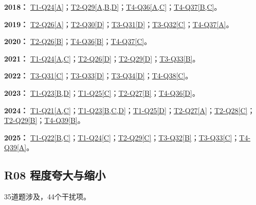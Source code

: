 \documentclass[11pt,a4paper]{article}
\begin{document}
\noindent\textbf{2018：} \hyperref[idx-2018-T1-Q24]{T1-Q24[A]}；\hyperref[idx-2018-T2-Q29]{T2-Q29[A,B,D]}；\hyperref[idx-2018-T4-Q36]{T4-Q36[A,C]}；\hyperref[idx-2018-T4-Q37]{T4-Q37[B,C]}。\par\smallskip
\noindent\textbf{2019：} \hyperref[idx-2019-T2-Q26]{T2-Q26[A]}；\hyperref[idx-2019-T2-Q30]{T2-Q30[D]}；\hyperref[idx-2019-T3-Q31]{T3-Q31[D]}；\hyperref[idx-2019-T3-Q32]{T3-Q32[C]}；\hyperref[idx-2019-T4-Q37]{T4-Q37[A]}。\par\smallskip
\noindent\textbf{2020：} \hyperref[idx-2020-T2-Q26]{T2-Q26[B]}；\hyperref[idx-2020-T4-Q36]{T4-Q36[B]}；\hyperref[idx-2020-T4-Q37]{T4-Q37[C]}。\par\smallskip
\noindent\textbf{2021：} \hyperref[idx-2021-T1-Q24]{T1-Q24[A,C]}；\hyperref[idx-2021-T2-Q26]{T2-Q26[D]}；\hyperref[idx-2021-T2-Q29]{T2-Q29[D]}；\hyperref[idx-2021-T3-Q33]{T3-Q33[B]}。\par\smallskip
\noindent\textbf{2022：} \hyperref[idx-2022-T3-Q31]{T3-Q31[C]}；\hyperref[idx-2022-T3-Q33]{T3-Q33[D]}；\hyperref[idx-2022-T3-Q34]{T3-Q34[D]}；\hyperref[idx-2022-T4-Q38]{T4-Q38[C]}。\par\smallskip
\noindent\textbf{2023：} \hyperref[idx-2023-T1-Q23]{T1-Q23[B,D]}；\hyperref[idx-2023-T1-Q25]{T1-Q25[C]}；\hyperref[idx-2023-T2-Q27]{T2-Q27[B]}；\hyperref[idx-2023-T4-Q36]{T4-Q36[D]}。\par\smallskip
\noindent\textbf{2024：} \hyperref[idx-2024-T1-Q21]{T1-Q21[A,C]}；\hyperref[idx-2024-T1-Q23]{T1-Q23[B,C,D]}；\hyperref[idx-2024-T1-Q25]{T1-Q25[D]}；\hyperref[idx-2024-T2-Q27]{T2-Q27[A]}；\hyperref[idx-2024-T2-Q28]{T2-Q28[C]}；\hyperref[idx-2024-T2-Q29]{T2-Q29[B]}；\hyperref[idx-2024-T4-Q39]{T4-Q39[B]}。\par\smallskip
\noindent\textbf{2025：} \hyperref[idx-2025-T1-Q22]{T1-Q22[B,C]}；\hyperref[idx-2025-T1-Q24]{T1-Q24[C]}；\hyperref[idx-2025-T2-Q29]{T2-Q29[C]}；\hyperref[idx-2025-T3-Q32]{T3-Q32[B]}；\hyperref[idx-2025-T3-Q33]{T3-Q33[C]}；\hyperref[idx-2025-T4-Q39]{T4-Q39[A]}。\par\smallskip
{}
\subsection{R08 程度夸大与缩小}\label{class-R08}
35道题涉及，44个干扰项。
\end{document}
